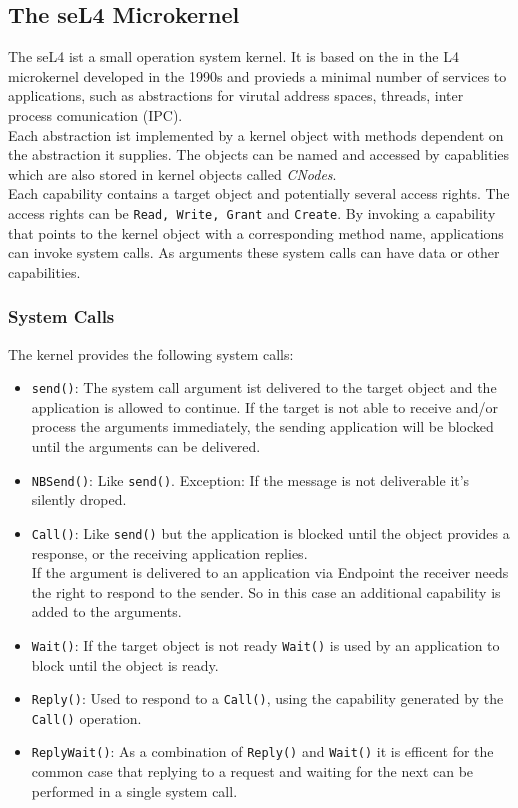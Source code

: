\subsection{The seL4 Microkernel}\label{sec:seL4}
	The seL4 \cite{Manual} ist a small operation system kernel. It is based on the in the L4 microkernel developed in the 1990s and provieds a minimal number of services to applications, such as abstractions for virutal address spaces, threads, inter process comunication (IPC). \\
	Each abstraction ist implemented by a kernel object with methods dependent on the abstraction it supplies. The objects can be named and accessed by capablities which are also stored in kernel objects called \textit{CNodes}. \\
	Each capability contains a target object and potentially several access rights. The access rights can be \texttt{Read, Write, Grant} and \texttt{Create}. By invoking a capability that points to the kernel object  with a corresponding method name, applications can invoke system calls. As arguments these system calls can have data or other capabilities. 

\subsubsection{System Calls}
The kernel provides the following system calls:
\begin{itemize}
\item \texttt{send()}: The system call argument ist delivered to the target object and the application is allowed to continue. If the target is not able to receive and/or process the arguments immediately, the sending application will be blocked until the arguments can be delivered.

\item \texttt{NBSend()}: Like \texttt{send()}. Exception: If the message is not deliverable it's silently droped.
\item \texttt{Call()}: Like \texttt{send()} but the application is blocked until the object provides a response, or the receiving application replies. \\
If the argument is delivered to an application via Endpoint the receiver needs the right to respond to the sender. So in this case an additional capability is added to the arguments. 
\item \texttt{Wait()}: If the target object is not ready \texttt{Wait()} is used by an application to block until the object is ready. 
\item \texttt{Reply()}: Used to respond to a \texttt{Call()}, using the capability generated by the \texttt{Call()} operation.
\item \texttt{ReplyWait()}: As a combination of \texttt{Reply()} and \texttt{Wait()} it is efficent for the common case that replying to a request and waiting for the next can be performed in a single system call. 
\end{itemize}
	
